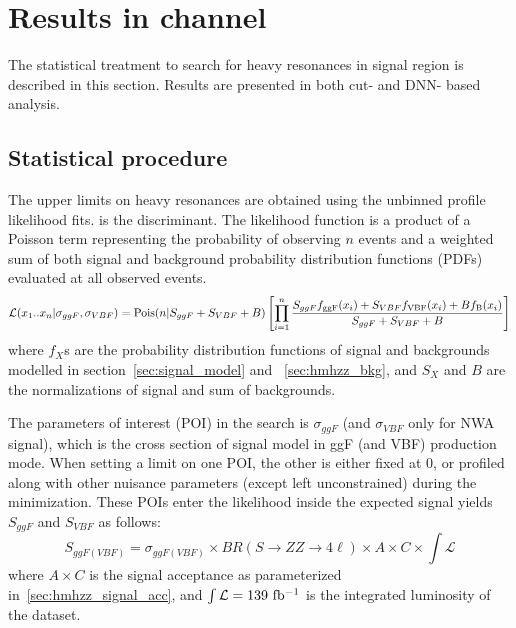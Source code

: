 \section{Results in \llll channel}
\label{sec:hmhzz_result_4l}

The statistical treatment to search for heavy resonances in signal region is described in this section.
Results are presented in both cut- and DNN- based analysis.

\subsection{Statistical procedure}

The upper limits on heavy resonances are obtained using the unbinned profile likelihood fits.
\mfl is the discriminant.
The likelihood function is a product of a Poisson term representing the probability of observing $n$ events 
and a weighted sum of both signal and background probability distribution functions (PDFs) evaluated at all observed events.
\begingroup
\small
\begin{equation}
  {\cal L } (x_{1}..x_{n}| \sigma_{ggF}, \sigma_{VBF}) = \textrm{Pois}(n|S_{ggF} + S_{VBF} + B)  \left[ \prod\limits^{n}_{i=1}
  \frac{S_{ggF} f_{\textrm{ggF}}(x_{i}) + S_{VBF} f_{\textrm{VBF}}(x_{i}) + B f_{\textrm{B}}(x_{i})}{S_{ggF} + S_{VBF} + B}
  \right]
\end{equation}
\endgroup
where $f_X$s are the probability distribution functions of signal and backgrounds modelled in section~\ref{sec:signal_model} and ~\ref{sec:hmhzz_bkg}, 
and $S_X$ and $B$ are the normalizations of signal and sum of backgrounds.

The parameters of interest (POI) in the search is $\sigma_{ggF}$ (and $\sigma_{VBF}$ only for NWA signal), which is the cross section of signal model in ggF (and VBF) production mode.
When setting a limit on one POI, the other is either fixed at 0, or profiled along with other nuisance parameters (except left unconstrained) during the minimization. 
These POIs enter the likelihood inside the expected signal yields $S_{ggF}$ and $S_{VBF}$ as follows:
\begingroup
\small
\begin{equation}
S_{ggF(VBF)} = \sigma_{ggF(VBF)} \times BR(S\rightarrow ZZ \rightarrow 4\ell) \times A \times C \times \int\mathcal{L}
\end{equation}
\endgroup
where $A\times C$ is the signal acceptance as parameterized in~\ref{sec:hmhzz_signal_acc}, and $\int\mathcal{L} = 139~\mbox{fb\(^{-1}\)} $ is the integrated luminosity of the dataset.

